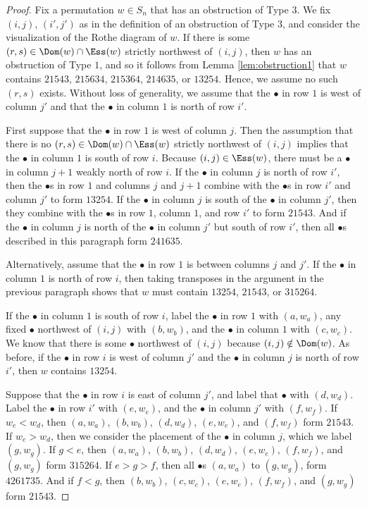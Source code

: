\begin{proof}
Fix a permutation $w \in S_n$ that has an obstruction of Type $3$.  We fix $(i,j)$, $(i',j')$ as in the definition of an obstruction of Type $3$, and consider the visualization of the Rothe diagram of $w$.  If there is some $(r,s) \in \Dom(w) \cap \Ess(w)$ strictly northwest of $(i,j)$, then $w$ has an obstruction of Type $1$,  and so it follows from Lemma \ref{lem:obstruction1} that $w$ contains $21543$, $215634$, $215364$, $214635$, or $13254$.  Hence, we assume no such $(r,s)$ exists.  Without loss of generality, we assume that the $\bullet$ in row $1$ is west of column $j'$ and that the $\bullet$ in column $1$ is north of row $i'$.  

First suppose that the $\bullet$ in row $1$ is west of column $j$.  Then the assumption that there is no $(r,s) \in \Dom(w) \cap \Ess(w)$ strictly northwest of $(i,j)$ implies that the $\bullet$ in column $1$ is south of row $i$.  Because $(i,j) \in \Ess(w)$, there must be a $\bullet$ in column $j+1$ weakly north of row $i$.  If the $\bullet$ in column $j$ is north of row $i'$, then the $\bullet$s in row $1$ and columns $j$ and $j+1$ combine with the $\bullet$s in row $i'$ and column $j'$ to form $13254$.  If the $\bullet$ in column $j$ is south of the $\bullet$ in column $j'$, then they combine with the $\bullet$s in row $1$, column $1$, and row $i'$ to form $21543$.  And if the $\bullet$ in column $j$ is north of the $\bullet$ in column $j'$ but south of row $i'$, then all $\bullet$s described in this paragraph form $241635$. 

Alternatively, assume that the $\bullet$ in row $1$ is between columns $j$ and $j'$.  If the $\bullet$ in column $1$ is north of row $i$, then taking transposes in the argument in the previous paragraph shows that $w$ must contain $13254$, $21543$, or $315264$.  

If the $\bullet$ in column $1$ is south of row $i$, label the $\bullet$ in row $1$ with $(a, w_a)$, any fixed $\bullet$ northwest of $(i,j)$ with $(b, w_b)$, and the $\bullet$ in column $1$ with $(c,w_c)$.  We know that there is some $\bullet$ northwest of $(i,j)$ because $(i,j) \notin \Dom(w)$.  As before, if the $\bullet$ in row $i$ is west of column $j'$ and the $\bullet$ in column $j$ is north of row $i'$, then $w$ contains $13254$.  

Suppose that the $\bullet$ in row $i$ is east of column $j'$, and label that $\bullet$ with $(d,w_d)$.  Label the $\bullet$ in row $i'$ with $(e,w_e)$, and the $\bullet$ in column $j'$ with $(f,w_f)$.  If $w_e<w_d$, then $(a,w_a)$, $(b,w_b)$, $(d,w_d)$, $(e,w_e)$, and $(f,w_f)$ form $21543$.  If $w_e>w_d$, then we consider the placement of the $\bullet$ in column $j$, which we label $(g,w_g)$.  If $g<e$, then $(a,w_a)$, $(b,w_b)$, $(d,w_d)$, $(e,w_e)$, $(f,w_f)$, and $(g,w_g)$ form $315264$.  If $e>g>f$, then all $\bullet$s $(a,w_a)$ to $(g,w_g)$, form $4261735$.  And if $f<g$, then $(b,w_b)$, $(c,w_c)$, $(e,w_e)$, $(f,w_f)$, and $(g,w_g)$ form $21543$.  


\end{proof}
